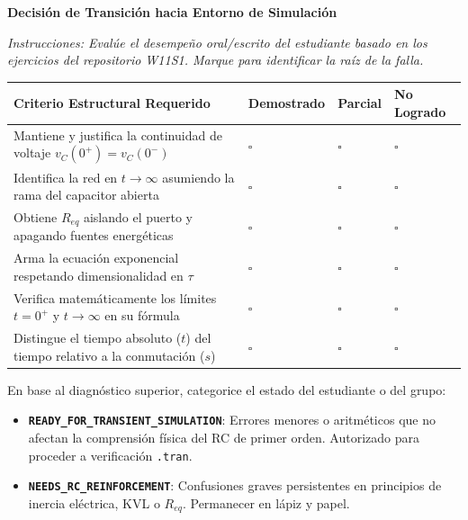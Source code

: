 \documentclass[11pt, a4paper]{article}
\begin{document}
\begin{tcolorbox}[colback=ucbblue!5!white, colframe=ucbblue, title=\textbf{Auditoría Docente de Evidencia Analítica RC (Readiness Gate)}]
    \centering \textbf{Decisión de Transición hacia Entorno de Simulación}
\end{tcolorbox}

\noindent \textit{Instrucciones: Evalúe el desempeño oral/escrito del estudiante basado en los ejercicios del repositorio W11S1. Marque para identificar la raíz de la falla.}

\vspace{0.4cm}
\renewcommand{\arraystretch}{1.6}
\noindent
\begin{tabularx}{\textwidth}{>{\RaggedRight\arraybackslash}X >{\centering\arraybackslash}p{2.5cm} >{\centering\arraybackslash}p{2cm} >{\centering\arraybackslash}p{2.5cm}}
\toprule
\textbf{Criterio Estructural Requerido} & \textbf{Demostrado} & \textbf{Parcial} & \textbf{No Logrado} \\ 
\midrule
Mantiene y justifica la continuidad de voltaje $v_C(0^+) = v_C(0^-)$ & $\square$ & $\square$ & $\square$ \\ \addlinespace
Identifica la red en $t \to \infty$ asumiendo la rama del capacitor abierta & $\square$ & $\square$ & $\square$ \\ \addlinespace
Obtiene $R_{eq}$ aislando el puerto y apagando fuentes energéticas & $\square$ & $\square$ & $\square$ \\ \addlinespace
Arma la ecuación exponencial respetando dimensionalidad en $\tau$ & $\square$ & $\square$ & $\square$ \\ \addlinespace
Verifica matemáticamente los límites $t=0^+$ y $t \to \infty$ en su fórmula & $\square$ & $\square$ & $\square$ \\ \addlinespace
Distingue el tiempo absoluto ($t$) del tiempo relativo a la conmutación ($s$) & $\square$ & $\square$ & $\square$ \\ 
\bottomrule
\end{tabularx}

\vspace{0.8cm}
\begin{tcolorbox}[colback=gray!5, colframe=gray!50, title=\textbf{Toma de Decisión Docente}]
En base al diagnóstico superior, categorice el estado del estudiante o del grupo:
\begin{itemize}
    \item[$\square$] \textbf{\texttt{READY\_FOR\_TRANSIENT\_SIMULATION}}: Errores menores o aritméticos que no afectan la comprensión física del RC de primer orden. Autorizado para proceder a verificación \texttt{.tran}.
    \item[$\square$] \textbf{\texttt{NEEDS\_RC\_REINFORCEMENT}}: Confusiones graves persistentes en principios de inercia eléctrica, KVL o $R_{eq}$. Permanecer en lápiz y papel.
\end{itemize}
\end{tcolorbox}
\end{document}
